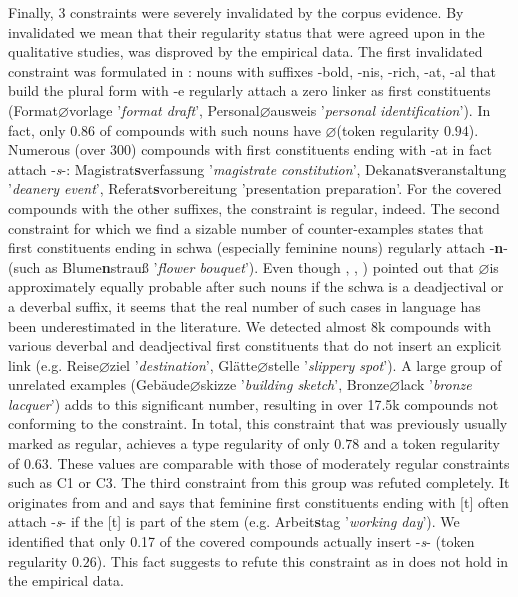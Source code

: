 \documentclass[10pt, a4paper]{article}
\newcommand{\zeroLinker}{\ensuremath{\boldsymbol{\varnothing}}}
\begin{document}
Finally, 3 constraints were severely invalidated by the corpus evidence. By invalidated we mean that their regularity status that were agreed upon in the qualitative studies, was disproved by the empirical data. The first invalidated constraint was formulated in \citet[107]{ortner_mueller-bollhagen_1991}: nouns with suffixes -bold, -nis, -rich, -at, -al that build the plural form with -e regularly attach a zero linker as first constituents (Format{\zeroLinker}vorlage '\textit{format draft}', Personal{\zeroLinker}ausweis '\textit{personal identification}'). In fact, only 0.86 of compounds with such nouns have \zeroLinker (token regularity $0.94$). Numerous (over 300) compounds with first constituents ending with -at in fact attach -\textit{s}-: Magistrat\textbf{s}verfassung '\textit{magistrate constitution}', Dekanat\textbf{s}veranstaltung '\textit{deanery event}', Referat\textbf{s}vorbereitung 'presentation preparation'. For the covered compounds with the other suffixes, the constraint is regular, indeed. The second constraint for which we find a sizable number of counter-examples states that first constituents ending in schwa (especially feminine nouns) regularly attach -\textbf{n}- (such as Blume\textbf{n}strauß '\textit{flower bouquet}'). Even though \citet[573]{fuhrhop_kuerschner_2015}, \citet[112]{kuerschner_2005}, \citet[93]{ortner_mueller-bollhagen_1991}) pointed out that \zeroLinker is approximately equally probable after such nouns if the schwa is a deadjectival or a deverbal suffix, it seems that the real number of such cases in language has been underestimated in the literature. We detected almost 8k compounds with various deverbal and deadjectival first constituents that do not insert an explicit link (e.g. Reise{\zeroLinker}ziel '\textit{destination}', Glätte{\zeroLinker}stelle '\textit{slippery spot}'). A large group of unrelated examples (Gebäude{\zeroLinker}skizze '\textit{building sketch}', Bronze{\zeroLinker}lack '\textit{bronze lacquer}') adds to this significant number, resulting in over 17.5k compounds not conforming to the constraint. In total, this constraint that was previously usually marked as regular, achieves a type regularity of only $0.78$ and a token regularity of $0.63$. These values are comparable with those of moderately regular constraints such as C1 or C3. The third constraint from this group was refuted completely. It originates from \citet[77]{nuebling_szczepaniak_2013} and \citet[74, 75]{ortner_mueller-bollhagen_1991} and says that feminine first constituents ending with [t] often attach -\textit{s}- if the [t] is part of the stem (e.g. Arbeit\textbf{s}tag '\textit{working day}'). We identified that only 0.17 of the covered compounds actually insert -\textit{s}- (token regularity $0.26$). This fact suggests to refute this constraint as in does not hold in the empirical data.
\end{document}
